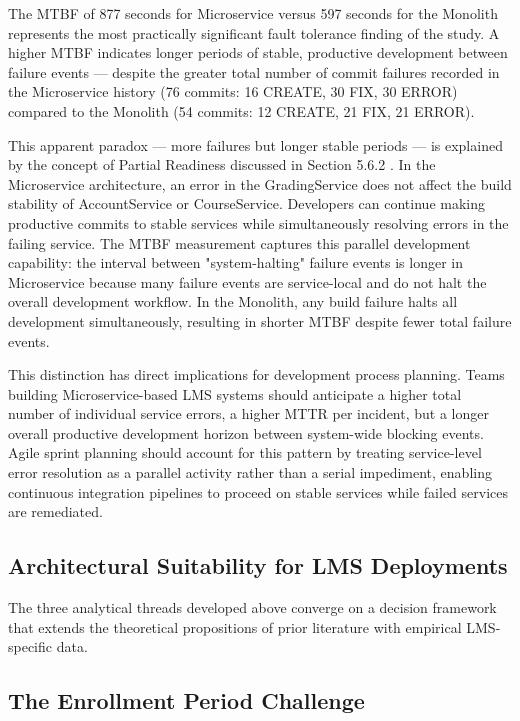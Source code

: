 The MTBF of 877 seconds for Microservice versus 597 seconds for the Monolith represents the most practically significant fault tolerance finding of the study. A higher MTBF indicates longer periods of stable, productive development between failure events — despite the greater total number of commit failures recorded in the Microservice history (76 commits: 16 CREATE, 30 FIX, 30 ERROR) compared to the Monolith (54 commits: 12 CREATE, 21 FIX, 21 ERROR).

This apparent paradox — more failures but longer stable periods — is explained by the concept of Partial Readiness discussed in Section 5.6.2 . In the Microservice architecture, an error in the GradingService does not affect the build stability of AccountService or CourseService. Developers can continue making productive commits to stable services while simultaneously resolving errors in the failing service. The MTBF measurement captures this parallel development capability: the interval between "system-halting" failure events is longer in Microservice because many failure events are service-local and do not halt the overall development workflow. In the Monolith, any build failure halts all development simultaneously, resulting in shorter MTBF despite fewer total failure events.

This distinction has direct implications for development process planning. Teams building Microservice-based LMS systems should anticipate a higher total number of individual service errors, a higher MTTR per incident, but a longer overall productive development horizon between system-wide blocking events. Agile sprint planning should account for this pattern by treating service-level error resolution as a parallel activity rather than a serial impediment, enabling continuous integration pipelines to proceed on stable services while failed services are remediated.

\subsection{Architectural Suitability for LMS Deployments}

The three analytical threads developed above converge on a decision framework that extends the theoretical propositions of prior literature with empirical LMS-specific data.

\subsection{The Enrollment Period Challenge}

